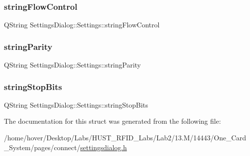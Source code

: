 \subsubsection{\texorpdfstring{stringFlowControl}{stringFlowControl}}
{\footnotesize\ttfamily Q\+String Settings\+Dialog\+::\+Settings\+::string\+Flow\+Control}

\mbox{\label{struct_settings_dialog_1_1_settings_aa2c662b2fb315f038e827d63d83b059b}} 
\subsubsection{\texorpdfstring{stringParity}{stringParity}}
{\footnotesize\ttfamily Q\+String Settings\+Dialog\+::\+Settings\+::string\+Parity}

\mbox{\label{struct_settings_dialog_1_1_settings_abde3c8410f779688ce6c2fcbbbb84f10}} 
\subsubsection{\texorpdfstring{stringStopBits}{stringStopBits}}
{\footnotesize\ttfamily Q\+String Settings\+Dialog\+::\+Settings\+::string\+Stop\+Bits}



The documentation for this struct was generated from the following file\+:\begin{DoxyCompactItemize}
\item 
/home/hover/\+Desktop/\+Labs/\+H\+U\+S\+T\+\_\+\+R\+F\+I\+D\+\_\+\+Labs/\+Lab2/13.\+M/14443/\+One\+\_\+\+Card\+\_\+\+System/pages/connect/\mbox{\hyperlink{settingsdialog_8h}{settingsdialog.\+h}}\end{DoxyCompactItemize}
